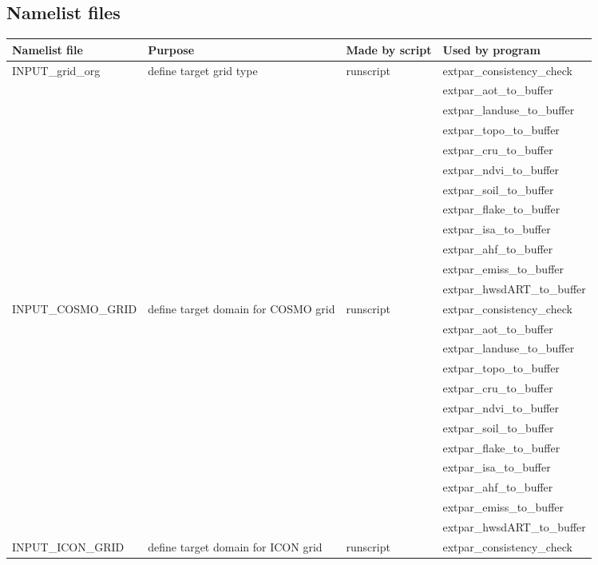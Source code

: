 \documentclass[a4paper,10pt,DIV14,BCOR1cm,titlepage,twoside]{scrartcl}
\begin{document}
\subsection{Namelist files}\label{namelist_input_for_extpar_namelist_files}
\begin{longtable}{|p{3.5cm}|p{4.8cm}|p{2.4cm}|p{3.8cm}|}
\hline 
\textbf{Namelist file} & \textbf{Purpose} & \textbf{Made by script} & \textbf{Used by program}  \\
\hline
\endhead
\hline
INPUT\_grid\_org & define target grid type    & runscript &  extpar\_consistency\_check \\
 & & & extpar\_aot\_to\_buffer \\
 & & & extpar\_landuse\_to\_buffer \\
 & & & extpar\_topo\_to\_buffer \\
 & & & extpar\_cru\_to\_buffer \\ 
 & & & extpar\_ndvi\_to\_buffer \\
 & & & extpar\_soil\_to\_buffer \\
 & & & extpar\_flake\_to\_buffer \\
 & & & extpar\_isa\_to\_buffer \\
 & & & extpar\_ahf\_to\_buffer \\
 & & & extpar\_emiss\_to\_buffer \\
 & & & extpar\_hwsdART\_to\_buffer \\
\hline 
INPUT\_COSMO\_GRID   & define target domain for COSMO grid    & runscript &  extpar\_consistency\_check \\
& & & extpar\_aot\_to\_buffer \\
 & & & extpar\_landuse\_to\_buffer \\
 & & & extpar\_topo\_to\_buffer \\
 & & & extpar\_cru\_to\_buffer \\ 
 & & & extpar\_ndvi\_to\_buffer \\
 & & & extpar\_soil\_to\_buffer \\
 & & & extpar\_flake\_to\_buffer \\
 & & & extpar\_isa\_to\_buffer \\
 & & & extpar\_ahf\_to\_buffer \\
 & & & extpar\_emiss\_to\_buffer \\
 & & & extpar\_hwsdART\_to\_buffer \\
\hline 
INPUT\_ICON\_GRID   & define target domain for ICON grid    & runscript &  extpar\_consistency\_check \\

\end{longtable}
\end{document}
